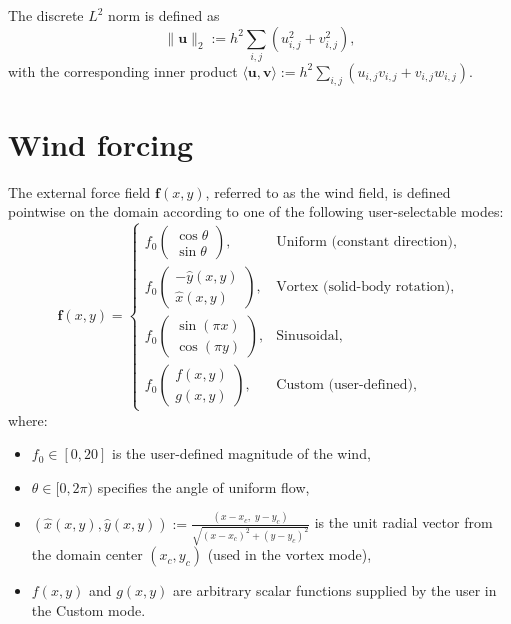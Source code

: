 \documentclass[11pt]{article}
\begin{document}
The discrete $L^2$ norm is defined as
\[
\|\bm{u}\|_2 := h^2 \sum_{i,j} \left( u_{i,j}^2 + v_{i,j}^2 \right),
\]
with the corresponding inner product
\(
\langle \bm{u}, \bm{v} \rangle := h^2 \sum_{i,j} (u_{i,j} v_{i,j} + v_{i,j} w_{i,j}).
\)


\section{Wind forcing}
The external force field $\bm{f}(x, y)$, referred to as the wind field, is defined pointwise on the domain according to one of the following user-selectable modes:
\[
  \bm{f}(x, y) =
  \begin{cases}
    f_0 \begin{pmatrix} \cos\theta \\ \sin\theta \end{pmatrix}, 
      & \text{Uniform (constant direction)}, \\[10pt]
    f_0 \begin{pmatrix} -\widehat{y}(x, y) \\ \widehat{x}(x, y) \end{pmatrix}, 
      & \text{Vortex (solid-body rotation)}, \\[10pt]
    f_0 \begin{pmatrix} \sin(\pi x) \\ \cos(\pi y) \end{pmatrix}, 
      & \text{Sinusoidal}, \\[10pt]
    f_0 \begin{pmatrix} f(x, y) \\ g(x, y) \end{pmatrix},
      & \text{Custom (user-defined)},
  \end{cases}
\]
where:
\begin{itemize}
  \item $f_0 \in [0, 20]$ is the user-defined magnitude of the wind,
  \item $\theta \in [0, 2\pi)$ specifies the angle of uniform flow,
  \item $(\widehat{x}(x,y), \widehat{y}(x,y)) := \frac{(x - x_c,\; y - y_c)}{\sqrt{(x - x_c)^2 + (y - y_c)^2}}$ is the unit radial vector from the domain center $(x_c, y_c)$ (used in the vortex mode),
  \item $f(x,y)$ and $g(x,y)$ are arbitrary scalar functions supplied by the user in the Custom mode.
\end{itemize}
\end{document}
